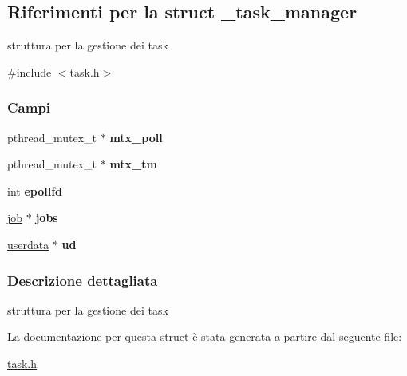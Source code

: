 \hypertarget{struct__task__manager}{}\subsection{Riferimenti per la struct \+\_\+task\+\_\+manager}
\label{struct__task__manager}


struttura per la gestione dei task  




{\ttfamily \#include $<$task.\+h$>$}

\subsubsection*{Campi}
\begin{DoxyCompactItemize}
\item 
\mbox{\label{struct__task__manager_a0eff048e3a19b6bbe261b4af3019c28f}} 
pthread\+\_\+mutex\+\_\+t $\ast$ {\bfseries mtx\+\_\+poll}
\item 
\mbox{\label{struct__task__manager_a78372105c15b092832027a7d223b20d9}} 
pthread\+\_\+mutex\+\_\+t $\ast$ {\bfseries mtx\+\_\+tm}
\item 
\mbox{\label{struct__task__manager_a41c0a9b36e9ab3042298273439780497}} 
int {\bfseries epollfd}
\item 
\mbox{\label{struct__task__manager_a12be6d72a39e0d75f4c6bc53a77e87f9}} 
\mbox{\hyperlink{struct__job}{job}} $\ast$ {\bfseries jobs}
\item 
\mbox{\label{struct__task__manager_a0188a9da724158bd8994425ec7b374ca}} 
\mbox{\hyperlink{struct__usersdata}{userdata}} $\ast$ {\bfseries ud}
\end{DoxyCompactItemize}


\subsubsection{Descrizione dettagliata}
struttura per la gestione dei task 

La documentazione per questa struct è stata generata a partire dal seguente file\+:\begin{DoxyCompactItemize}
\item 
\mbox{\hyperlink{task_8h}{task.\+h}}\end{DoxyCompactItemize}
